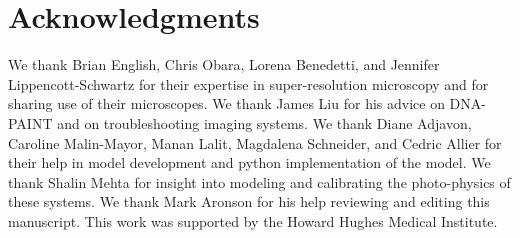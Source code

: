 \section{Acknowledgments}
We thank Brian English, Chris Obara, Lorena Benedetti, and Jennifer Lippencott-Schwartz for their expertise in
    super-resolution microscopy and for sharing use of their microscopes. 
    We thank James Liu for his advice on DNA-PAINT and on troubleshooting imaging systems.
    We thank Diane Adjavon, Caroline Malin-Mayor, Manan Lalit, Magdalena Schneider, and Cedric Allier 
    for their help in model development and python implementation of the model. 
    We thank Shalin Mehta for insight into modeling and calibrating the photo-physics of these systems.
    We thank Mark Aronson for his help reviewing and editing this manuscript. 
    This work was supported by the Howard Hughes Medical Institute. 